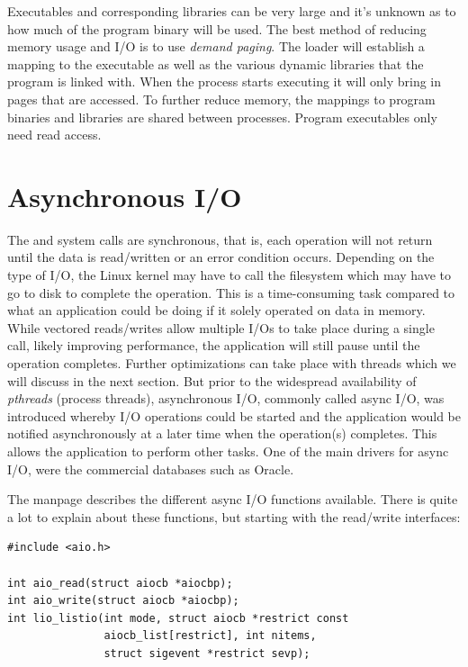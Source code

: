 \noindent
Executables and corresponding libraries can be very large and it's unknown as to how much of the program binary will be used. The best method of reducing memory usage and I/O is to use \textit{demand paging}. The loader will establish a mapping to the executable as well as the various dynamic libraries that the program is linked with. When the process starts executing it will only bring in pages that are accessed. To further reduce memory, the mappings to program binaries and libraries are shared between processes. Program executables only need read access.


\section{Asynchronous I/O}

The  and  system calls are synchronous, that is, each operation will not return until the data is read/written or an error condition occurs. Depending on the type of I/O, the Linux kernel may have to call the filesystem which may have to go to disk to complete the operation. This is a time-consuming task compared to what an application could be doing if it solely operated on data in memory. While vectored reads/writes allow multiple I/Os to take place during a single call, likely improving performance, the application will still pause until the operation completes. Further optimizations can take place with threads which we will discuss in the next section. But prior to the widespread availability of \textit{pthreads} (process threads), asynchronous I/O, commonly called async I/O, was introduced whereby I/O operations could be started and the application would be notified asynchronously at a later time when the operation(s) completes. This allows the application to perform other tasks. One of the main drivers for async I/O, were the commercial databases such as Oracle. 

The  manpage describes the different async I/O functions available. There is quite a lot to explain about these functions, but starting with the read/write interfaces:

\begin{lstlisting}
#include <aio.h>

int aio_read(struct aiocb *aiocbp);
int aio_write(struct aiocb *aiocbp);
int lio_listio(int mode, struct aiocb *restrict const 
               aiocb_list[restrict], int nitems, 
               struct sigevent *restrict sevp);
\end{lstlisting}

